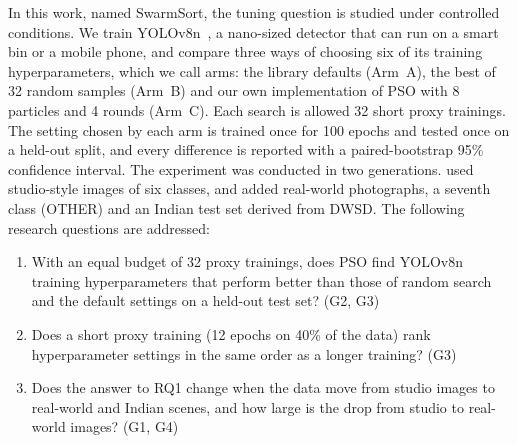 In this work, named SwarmSort, the tuning question is studied under controlled conditions. We train YOLOv8n~\cite{jocher2023ultralytics}, a nano-sized detector that can run on a smart bin or a mobile phone, and compare three ways of choosing six of its training hyperparameters, which we call arms: the library defaults (Arm~A), the best of 32 random samples (Arm~B) and our own implementation of PSO with 8 particles and 4 rounds (Arm~C). Each search is allowed 32 short proxy trainings. The setting chosen by each arm is trained once for 100 epochs and tested once on a held-out split, and every difference is reported with a paired-bootstrap 95\% confidence interval. The experiment was conducted in two generations. \genone used studio-style images of six classes, and \gentwo added real-world photographs, a seventh class (OTHER) and an Indian test set derived from DWSD. The following research questions are addressed:
\begin{enumerate}
\item[RQ1:] With an equal budget of 32 proxy trainings, does PSO find YOLOv8n training hyperparameters that perform better than those of random search and the default settings on a held-out test set? (G2, G3)
\item[RQ2:] Does a short proxy training (12 epochs on 40\% of the data) rank hyperparameter settings in the same order as a longer training? (G3)
\item[RQ3:] Does the answer to RQ1 change when the data move from studio images to real-world and Indian scenes, and how large is the drop from studio to real-world images? (G1, G4)
\end{enumerate}

